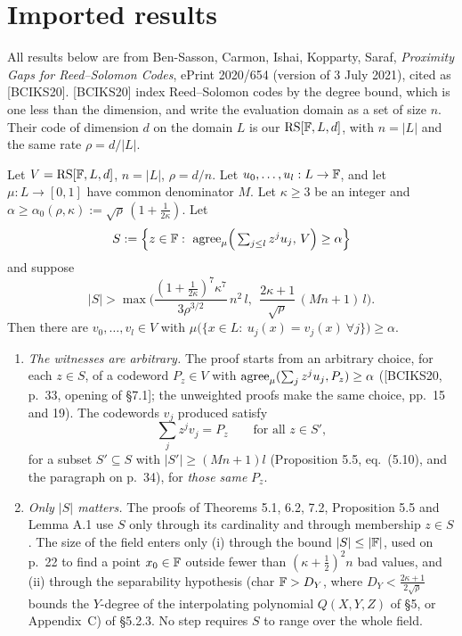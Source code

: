 \section{Imported results}

All results below are from Ben-Sasson, Carmon, Ishai, Kopparty, Saraf,
\emph{Proximity Gaps for Reed--Solomon Codes}, ePrint 2020/654 (version of 3 July 2021),
cited as [BCIKS20]. [BCIKS20] index Reed--Solomon codes by the degree bound, which is one less than the dimension,
and write the evaluation domain as a set of size $n$. Their code of dimension $d$ on the domain
$L$ is our $\mathrm{RS}[\mathbb{F},L,d]$, with $n=|L|$ and the same rate $\rho=d/|L|$.

\begin{imported}\label{ext:bciks72}
Let $V=\mathrm{RS}[\mathbb{F},L,d]$, $n=|L|$, $\rho=d/n$. Let $u_0,\dots,u_l:L\to\mathbb{F}$, and let
$\mu:L\to[0,1]$ have common denominator $M$. Let $\kappa\ge3$ be an integer and
$\alpha\ge\alpha_0(\rho,\kappa):=\sqrt\rho\,(1+\tfrac1{2\kappa})$. Let
\[
S:=\Big\{z\in\F:\ \agree_\mu\Big(\textstyle\sum_{j\le l}z^ju_j,\,V\Big)\ge\alpha\Big\}
\]
and suppose
\[
|S|>\max\Big(\frac{(1+\frac1{2\kappa})^7\kappa^7}{3\rho^{3/2}}\,n^2\,l,\ \
\frac{2\kappa+1}{\sqrt\rho}\,(Mn+1)\,l\Big).\tag{$\star$}
\]
Then there are $v_0,\dots,v_l\in V$ with
$\mu\big(\{x\in L:\ u_j(x)=v_j(x)\ \forall j\}\big)\ge\alpha$.
\end{imported}

\begin{remark}\label{ext:proof-facts}
\leavevmode
\begin{enumerate}
\item[(F1)] \emph{The witnesses are arbitrary.} The proof starts from an arbitrary choice,
for each $z\in S$, of a codeword $P_z\in V$ with
$\mathrm{agree}_\mu(\sum_jz^ju_j,P_z)\ge\alpha$ ([BCIKS20, p.~33, opening of \S7.1]; the
unweighted proofs make the same choice, pp.~15 and 19). The codewords $v_j$ produced
satisfy
\[
\textstyle\sum_{j}z^jv_j=P_z\qquad\text{for all }z\in S',
\]
for a subset $S'\subseteq S$ with $|S'|\ge(Mn+1)l$ (Proposition 5.5, eq.~(5.10), and
the paragraph on p.~34), for \emph{those same} $P_z$.
\item[(F2)] \emph{Only $|S|$ matters.} The proofs of Theorems 5.1, 6.2, 7.2,
Proposition 5.5 and Lemma A.1 use $S$ only through its cardinality and through
membership $z\in S$. The size of the field enters only (i) through the bound
$|S|\le|\mathbb{F}|$, used on p.~22 to find a point $x_0\in\mathbb{F}$ outside fewer than
$(\kappa+\frac12)^2n$ bad values, and (ii) through the separability hypothesis (char
$\mathbb{F}>D_Y$, where $D_Y<\frac{2\kappa+1}{2\sqrt\rho}$ bounds the $Y$-degree of the interpolating
polynomial $Q(X,Y,Z)$ of \S5, or Appendix~C) of \S5.2.3. No step requires $S$ to range over the whole field.
\end{enumerate}
\end{remark}


